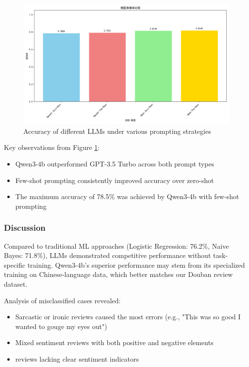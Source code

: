 \documentclass{article}
\begin{document}
\begin{figure}[h]
    \centering
    \includegraphics[width=1\columnwidth]{pic/T2P2.c.acc.png}
    \caption{Accuracy of different LLMs under various prompting strategies}
    \label{fig:llm_accuracy}
\end{figure}

Key observations from Figure \ref{fig:llm_accuracy}:
\begin{itemize}
    \item Qwen3-4b outperformed GPT-3.5 Turbo across both prompt types
    \item Few-shot prompting consistently improved accuracy over zero-shot
    \item The maximum accuracy of 78.5\% was achieved by Qwen3-4b with few-shot prompting
\end{itemize}

\subsubsection{Discussion}
\label{sssec:discussion}

Compared to traditional ML approaches (Logistic Regression: 76.2\%, Naive Bayes: 71.8\%), LLMs demonstrated competitive performance without task-specific training. Qwen3-4b's superior performance may stem from its specialized training on Chinese-language data, which better matches our Douban review dataset.

Analysis of misclassified cases revealed:
\begin{itemize}
    \item Sarcastic or ironic reviews caused the most errors (e.g., "This was so good I wanted to gouge my eyes out")
    \item Mixed sentiment reviews with both positive and negative elements
    \item reviews lacking clear sentiment indicators
\end{itemize}
\end{document}
